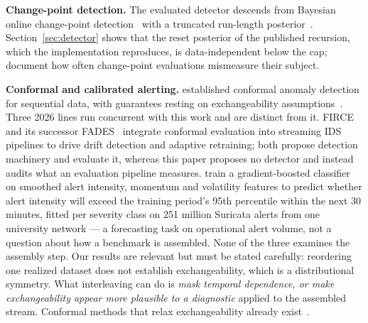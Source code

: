 \documentclass[manuscript,screen,nonacm]{acmart}
\begin{document}
\textbf{Change-point detection.} The evaluated detector descends from Bayesian
online change-point detection~\citep{adams2007bocpd} with a truncated run-length
posterior~\citep{fearnhead2007online,knoblauch2018bocpd}.
Section~\ref{sec:detector} shows that the reset posterior of the published
recursion, which the implementation reproduces, is data-independent below the
cap; \citet{vandeburg2020evaluation} document how often change-point
evaluations mismeasure their subject.

\textbf{Conformal and calibrated alerting.} \citet{laxhammar2014conformal} established conformal anomaly detection
for sequential data, with guarantees resting on exchangeability
assumptions~\citep{vovk2005alrw}. Three 2026 lines run concurrent with this work
and are distinct from it. FIRCE~\citep{barrett2026firce} and its successor
FADES~\citep{barrett2026fades} integrate conformal evaluation into streaming IDS
pipelines to drive drift detection and adaptive retraining; both propose
detection machinery and evaluate it, whereas this paper proposes no detector and
instead audits what an evaluation pipeline measures. \citet{gurjar2026tailrisk} train a gradient-boosted classifier on smoothed
alert intensity, momentum and volatility features to predict whether alert
intensity will exceed the training period's 95th percentile within the next
30 minutes, fitted per severity class on 251 million Suricata alerts from one
university network --- a forecasting task on operational alert volume, not a
question about how a benchmark is assembled. None of the three examines the assembly step. Our
results are
relevant but must be stated carefully: reordering one realized dataset does not
establish exchangeability, which is a distributional symmetry. What
interleaving can do is \emph{mask temporal dependence, or make exchangeability
appear more plausible to a diagnostic} applied to the assembled stream.
Conformal methods that relax exchangeability already
exist~\citep{barber2023beyond}.
\end{document}
